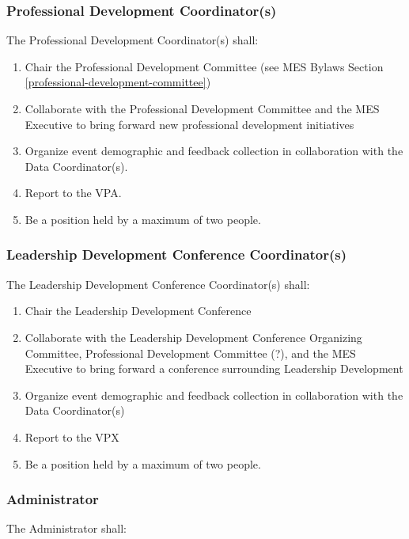 \subsubsection{Professional Development Coordinator(s)}
\label{professional-development-coordinators}
The Professional Development Coordinator(s) shall:

\begin{enumerate}
 \item
  Chair the Professional Development Committee (see MES Bylaws Section \ref{professional-development-committee})
 \item
  Collaborate with the Professional Development Committee and the MES Executive to bring forward new professional development initiatives
 \item
  Organize event demographic and feedback collection in collaboration with the Data Coordinator(s).
 \item
  Report to the VPA.
 \item
  Be a position held by a maximum of two people.

\end{enumerate}

\subsubsection{Leadership Development Conference Coordinator(s)}
\label{leadership-development-conference-coordinators}
The Leadership Development Conference Coordinator(s) shall:

\begin{enumerate}
 \item
  Chair the Leadership Development Conference
 \item
  Collaborate with the Leadership Development Conference Organizing Committee, Professional Development Committee (?), and the MES Executive to bring forward a conference surrounding Leadership Development
 \item
  Organize event demographic and feedback collection in collaboration with the Data Coordinator(s)
 \item
  Report to the VPX
 \item
  Be a position held by a maximum of two people.
\end{enumerate}

\subsubsection{Administrator}
\label{administrator}
The Administrator shall:

